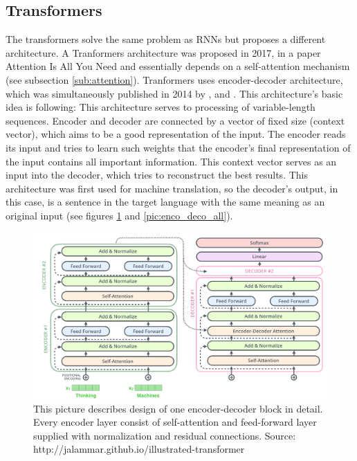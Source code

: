 \subsection{Transformers}
\label{sub:transformers}
The transformers solve the same problem as RNNs but proposes a different architecture. A Tranformers architecture was proposed in 2017, in a paper Attention Is All You Need \citep{Vaswani2017} and essentially depends on a self-attention mechanism (see subsection \ref{sub:attention}). %
Tranformers uses encoder-decoder architecture, which was simultaneously published in 2014 by \citep{Cho2014}, \citep{Sutskever2014} and \citep{Wu2016}. This architecture's basic idea is following: 
This architecture serves to processing of variable-length sequences. Encoder and decoder are connected by a vector of fixed size (context vector), which aims to be a good representation of the input. %
The encoder reads its input and tries to learn such weights that the encoder's final representation of the input contains all important information. This context vector serves as an input into the decoder, which tries to reconstruct the best results. This architecture was first used for machine translation, so the decoder's output, in this case, is a sentence in the target language with the same meaning as an original input (see figures \ref{pic:enco_deco}  and \ref{pic:enco_deco_all}).
\begin{figure}[!h]
\centering
\includegraphics[width=1\columnwidth]{../img/trans_arch}
\protect\caption{This picture describes design of one encoder-decoder block in detail. Every encoder layer consist of self-attention and feed-forward layer supplied with normalization and residual connections. Source: http://jalammar.github.io/illustrated-transformer }
\label{pic:enco_deco}
\end{figure}


